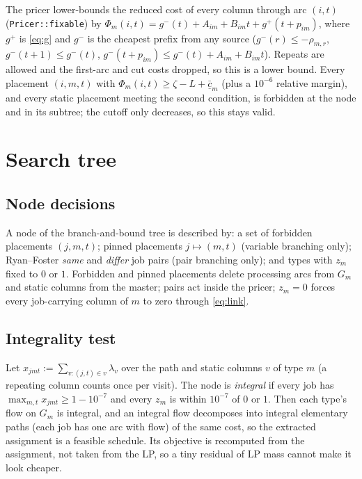 \documentclass[11pt,a4paper]{article}
\theoremstyle{definition}
\theoremstyle{remark}
\newcommand{\code}[1]{\texttt{#1}}
\newcommand{\rc}{\bar c}
\begin{document}
The pricer lower-bounds the reduced cost of every column through arc $(i,t)$
(\code{Pricer::fixable}) by $\Phi_m(i,t)=g^-(t)+A_{im}+B_{im}t+g^+(t+p_{im})$,
where $g^+$ is \eqref{eq:g} and $g^-$ is the cheapest prefix from any source
($g^-(r)\le-\rho_{m,r}$, $g^-(t+1)\le g^-(t)$,
$g^-(t+p_{im})\le g^-(t)+A_{im}+B_{im}t$). Repeats are allowed and the
first-arc and cut costs dropped, so this is a lower bound. Every placement
$(i,m,t)$ with $\Phi_m(i,t)\ge\zeta-L+\underline{\rc}_m$ (plus a $10^{-6}$
relative margin), and every static placement meeting the second condition, is
forbidden at the node and in its subtree; the cutoff only decreases, so this
stays valid.

\section{Search tree}\label{sec:tree}

\subsection{Node decisions}
A node of the branch-and-bound tree is described by: a set of forbidden
placements $(j,m,t)$; pinned placements $j\mapsto(m,t)$ (variable branching
only); Ryan--Foster \emph{same} and \emph{differ} job pairs (pair branching
only); and types with $z_m$ fixed to $0$ or $1$. Forbidden and pinned
placements delete processing arcs from $G_m$ and static columns from the
master; pairs act inside the pricer; $z_m=0$ forces every job-carrying column
of $m$ to zero through \eqref{eq:link}.

\subsection{Integrality test}
Let $x_{jmt}:=\sum_{v:(j,t)\in v}\lambda_v$ over the path and static columns $v$
of type $m$ (a repeating column counts once per visit). The node is
\emph{integral} if every job has $\max_{m,t}x_{jmt}\ge1-10^{-7}$ and every
$z_m$ is within $10^{-7}$ of $0$ or $1$. Then each type's flow on $G_m$ is
integral, and an integral flow decomposes into integral elementary paths (each
job has one arc with flow) of the same cost, so the extracted assignment is a
feasible schedule. Its objective is recomputed from the assignment, not taken
from the LP, so a tiny residual of LP mass cannot make it look cheaper.
\end{document}
